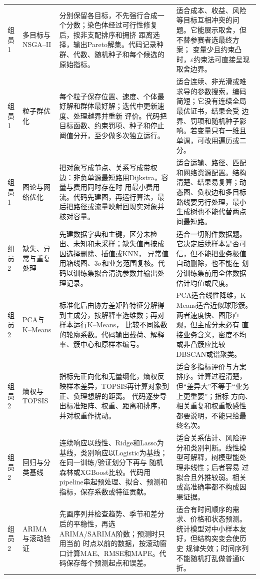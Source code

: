 \begin{longtable}{p{1.25cm}p{2.55cm}p{6.25cm}p{5.45cm}}
组员1 & 多目标与NSGA--II
& 分别保留各目标，不先强行合成一个分数；染色体经过可行性修复后，按非支配排序和拥挤
距离选择，输出Pareto解集。代码记录种群、代数、随机种子和每个候选的原始指标。
& 适合成本、收益、风险等目标互相冲突的问题。它能展示取舍，但不替参赛者选最终方案；
变量少且约束凸时，$\varepsilon$约束法可直接呈现取舍边界。\\

组员1 & 粒子群优化
& 每个粒子保存位置、速度、个体最好解和群体最好解；迭代中更新速度、处理越界并重新
评价。代码把目标函数、约束罚项、种子和停止阈值分开，至少做多次独立运行。
& 适合连续、非光滑或难求导的参数搜索，编码简短；它没有连续全局最优证书，结果会受
边界、罚项和随机种子影响。若变量只有一维且单调，可改用遍历或二分。\\

组员1 & 图论与网络优化
& 把对象写成节点、关系写成带权边：非负单源最短路用Dijkstra，容量与费用同时存在时
用最小费用流。代码先建图，再运行算法，最后把路径或流量映射回现实对象并核对容量。
& 适合运输、路径、匹配和网络资源配置。结构清楚、结果易复算；动态图、负权边和多目标
路线要另行处理，最小生成树也不能代替两点间最短路。\\

组员2 & 缺失、异常与重复处理
& 先建数据字典和主键，区分未检出、未知和未采样；缺失值再按成因选择删除、插值或KNN，
异常值用箱线图、$3\sigma$和业务范围复核。代码以训练集拟合清洗参数并输出处理记录。
& 适合一切附件数据题。它决定后续样本是否可信，但不能把业务极值自动删除，也不能在
划分训练集前用全体数据估计均值或尺度。\\

组员2 & PCA与K--Means
& 标准化后由协方差矩阵特征分解得到主成分，按解释率选维数；再对样本运行K--Means，
比较不同簇数的轮廓系数。代码输出载荷、解释率、簇中心和原样本编号。
& PCA适合线性降维，K--Means适合近似球形簇。两者速度快、图形直观，但主成分未必有
直接业务含义，密度不均或非凸簇应比较DBSCAN或谱聚类。\\

组员2 & 熵权与TOPSIS
& 指标先正向化和无量纲化，熵权反映样本差异，TOPSIS再计算对象到正、负理想解的距离。
代码逐步导出标准矩阵、权重、距离和排序，并对权重作扰动。
& 适合多指标评价与方案排序。计算过程清楚，但“差异大”不等于“业务上更重要”；指标
方向、相关重复和权重敏感性都要说明，不能只给最终名次。\\

组员2 & 回归与分类基线
& 连续响应以线性、Ridge和Lasso为基线，类别响应以Logistic为基线；在同一训练/验证划分下再与
随机森林或XGBoost比较。代码用pipeline串起预处理、拟合、预测和指标，保存系数或特征贡献。
& 适合关系估计、风险评分和类别判断。线性模型可解释，树模型能处理非线性；后者容易
过拟合且外推较弱。相关或高准确率都不构成因果证据。\\

组员2 & ARIMA与滚动验证
& 先画序列并检查趋势、季节和差分后的平稳性，再选ARIMA/SARIMA阶数；预测时只用当前
时点以前的数据，按滚动窗口计算MAE、RMSE和MAPE。代码保存每个预测起点和误差。
& 适合有时间顺序的需求、价格和状态预测。统计模型对中小样本友好，但结构突变会使历史
规律失效；时间序列不能随机打乱做普通K折。\\
\end{longtable}
\normalsize

